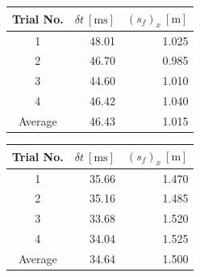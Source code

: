 \documentclass[a4paper]{article}
\begin{document}
\begin{figure}[h]
	\begin{minipage}{0.45\textwidth}
		\centering
		\begin{tabular}{crr}
			\toprule
			Trial No. & $\delta t \ [\si{\milli\second}]$ & $(s_f)_x \ [\si{\meter}]$\\
			\midrule
			1 & 48.01 & 1.025\\
			2 & 46.70 & 0.985\\
			3 & 44.60 & 1.010\\
			4 & 46.42 & 1.040\\
			\midrule
			Average & 46.43 & 1.015 \\
			\bottomrule
		\end{tabular}
	\end{minipage}
	\hspace{1cm}
	\begin{minipage}{0.45\textwidth}
		\centering
		\begin{tabular}{crr}
			\toprule
			Trial No. & $\delta t \ [\si{\milli\second}]$ & $(s_f)_x \ [\si{\meter}]$\\
			\midrule
			1 & 35.66 & 1.470\\
			2 & 35.16 & 1.485\\
			3 & 33.68 & 1.520\\
			4 & 34.04 & 1.525\\
			\midrule
			Average & 34.64 & 1.500 \\
			\bottomrule
		\end{tabular}
	\end{minipage}
\end{figure}
\end{document}
